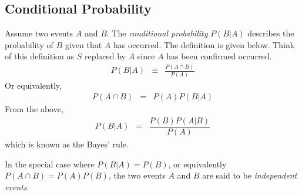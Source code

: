 \subsection{Conditional Probability}

Assume two events $A$ and $B$. The \textit{conditional probability} $P(B|A)$ describes the probability of $B$ given that $A$ has occurred. The definition is given below. Think of this definition as $S$ replaced by $A$ since $A$ has been confirmed occurred.
\begin{eqnarray}
  P(B|A) &\equiv& \frac{P(A\cap B)}{P(A)} \nonumber
\end{eqnarray}
Or equivalently,
\begin{eqnarray}
  P(A\cap B) &=& P(A)P(B|A) \nonumber
\end{eqnarray}
From the above,
\begin{eqnarray}
  P(B|A) &=& \dfrac{P(B)P(A|B)}{P(A)} \nonumber
\end{eqnarray}
which is known as the Bayes' rule.

In the special case where $P(B|A)=P(B)$, or equivalently $P(A\cap B) = P(A)P(B)$, the two events $A$ and $B$ are said to be \textit{independent events}.
